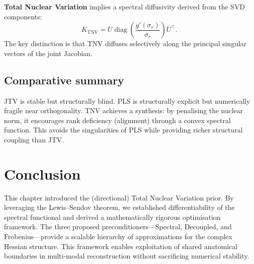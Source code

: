 \textbf{Total Nuclear Variation} implies a spectral diffusivity derived from the SVD components:
\begin{equation}
K_{\mathrm{TNV}}
=
U \operatorname{diag}\left(\frac{g'(\sigma_r)}{\sigma_r}\right) U^\top.
\end{equation}
The key distinction is that TNV diffuses selectively along the principal singular vectors of the joint Jacobian.

\subsection{Comparative summary}

JTV is stable but structurally blind. PLS is structurally explicit but numerically fragile near orthogonality. TNV achieves
a synthesis: by penalising the nuclear norm, it encourages rank deficiency (alignment) through a convex spectral function.
This avoids the singularities of PLS while providing richer structural coupling than JTV.

\section{Conclusion}

This chapter introduced the (directional) Total Nuclear Variation prior. By leveraging the Lewis--Sendov theorem, we established
differentiability of the spectral functional and derived a mathematically rigorous optimisation framework. The three proposed
preconditioners---Spectral, Decoupled, and Frobenius---provide a scalable hierarchy of approximations for the complex Hessian
structure. This framework enables exploitation of shared anatomical boundaries in multi-modal reconstruction without sacrificing
numerical stability.
